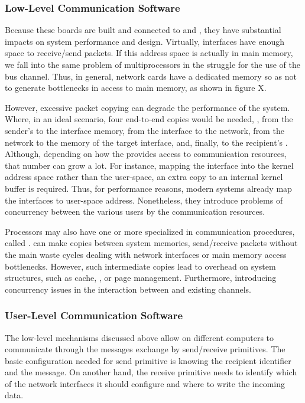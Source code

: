 			\subsubsection{Low-Level Communication Software}
			\label{sec.multicomputers_low_sw}

				Because these boards are built and connected to \cpus and \ram,
				they have substantial impacts on system performance and \os design.
				Virtually, interfaces have enough \ram space to receive/send packets.
				If this address space is actually in main memory, we fall into the same
				problem of multiprocessors in the struggle for the use of the bus channel.
				Thus, in general, network cards have a dedicated memory so as not to
				generate bottlenecks in access to main memory, as shown in figure X.

				However, excessive packet copying can degrade the performance of the system.
				Where, in an ideal scenario, four end-to-end copies would be needed,
				\ei, from the sender's \ram to the interface memory, from the interface
				to the network, from the network to the memory of the target interface, and,
				finally, to the recipient's \ram.
				Although, depending on how the \os provides access to communication
				resources, that number can grow a lot.
				For instance, mapping the interface into the kernel address space
				rather than the user-space, an extra copy to an internal kernel
				buffer is required.
				Thus, for performance reasons, modern systems already map the interfaces
				to user-space address.
				Nonetheless, they introduce problems of concurrency between the various
				users by the communication resources.

				Processors may also have one or more \cpus specialized in
				communication procedures, called \dma.
				\dmas can make copies between system memories, send/receive packets
				without the main \cpus waste cycles dealing with network interfaces
				or main memory access bottlenecks.
				However, such intermediate copies lead to overhead on system structures,
				such as cache, \tlb, or page management.
				Furthermore, introducing concurrency issues in the interaction between
				\cpus and existing \dma channels.

			\subsubsection{User-Level Communication Software}
			\label{sec.multicomputers_user_sw}

				The low-level mechanisms discussed above allow \cpus on different
				computers to communicate through the messages exchange by
				send/receive primitives.
				The basic configuration needed for send primitive is knowing the
				recipient identifier and the message.
				On another hand, the receive primitive needs to identify which of
				the network interfaces it should configure and where to write the
				incoming data.

